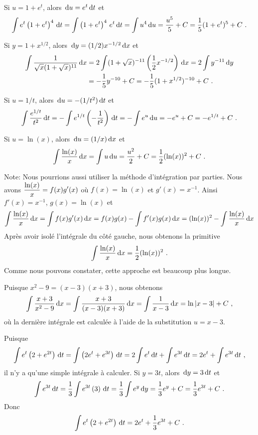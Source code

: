 {
Si $u=1+e^t$, alors $\,\mathrm{d}u = e^t \,\mathrm{d}t$ et
\[
\int e^t\left( 1 + e^t\right)^4 \,\mathrm{d}t =
\int \left( 1 + e^t\right)^4 \, e^t \,\mathrm{d}t = \int u^4 \,\mathrm{d}u
= \frac{u^5}{5} + C = \frac{1}{5}(1+e^t)^5 + C \ .
\]

Si $y=1+x^{1/2}$, alors $\,\mathrm{d}y = (1/2) x^{-1/2} \,\mathrm{d}x$ et
\begin{align*}
\int \frac{1}{\sqrt{x}(1+\sqrt{x})^{11}} \,\mathrm{d}x
&= 2 \int (1+\sqrt{x})^{-11} \left(\frac{1}{2} x^{-1/2}\right) \,\mathrm{d}x
= 2 \int y^{-11} \,\mathrm{d}y \\
&= -\frac{1}{5} y^{-10} + C = -\frac{1}{5} (1+x^{1/2})^{-10} + C \ .
\end{align*}

Si $u=1/t$, alors $\,\mathrm{d}u = -(1/t^2) \,\mathrm{d}t$ et
\[
\int \frac{e^{1/t}}{t^2} \,\mathrm{d}t =
- \int e^{1/t} \left(-\frac{1}{t^2}\right) \,\mathrm{d}t
= -\int e^u \,\mathrm{d}u = -e^u + C = -e^{1/t} + C \ .
\]

Si $u=\ln(x)$, alors $\,\mathrm{d}u = (1/x) \,\mathrm{d}x$ et
\[
\int \frac{\ln(x)}{x} \,\mathrm{d}x = \int u \,\mathrm{d}u
= \frac{u^2}{2} + C = \frac{1}{2} (\ln(x))^2 + C \ .
\]

\noindent Note: Nous pourrions aussi utiliser la méthode d'intégration
par parties.  Nous avons $\displaystyle \frac{\ln(x)}{x} = f(x)g'(x)$ où
$f(x)= \ln(x)$ et $g'(x)=x^{-1}$.  Ainsi $f'(x) = x^{-1}$, $g(x) = \ln(x)$
et
\[
\int \frac{\ln(x)}{x} \,\mathrm{d}x = \int f(x) g'(x) \,\mathrm{d}x
= f(x) g(x) - \int f'(x) g(x) \,\mathrm{d}x
= (\ln(x))^2 - \int \frac{\ln(x)}{x} \,\mathrm{d}x
\]
Après avoir isolé l'intégrale du côté gauche, nous obtenons la
primitive
\[
\int \frac{\ln(x)}{x} \,\mathrm{d}x = \frac{1}{2} (\ln(x))^2 \ .
\]
Comme nous pouvons constater, cette approche est beaucoup plus longue.

Puisque $x^2-9 = (x-3)(x+3)$, nous obtenons
\[
\int \frac{x+3}{x^2-9} \,\mathrm{d}x = \int \frac{x+3}{(x-3)(x+3)} \,\mathrm{d}x
= \int \frac{1}{x-3} \,\mathrm{d}x = \ln|x-3| + C \ ,
\]
où la dernière intégrale est calculée à l'aide de la substitution
$u=x-3$.

Puisque
\[
\int e^{t}\left( 2 + e^{2t}\right) \,\mathrm{d}t
= \int \left( 2e^{t} + e^{3t}\right) \,\mathrm{d}t
= 2 \int e^{t} \,\mathrm{d}t + \int e^{3t} \,\mathrm{d}t
= 2 e^t + \int e^{3t} \,\mathrm{d}t \ ,
\]
il n'y a qu'une simple intégrale à calculer.  Si $y=3t$,
alors $\,\mathrm{d}y = 3\,\mathrm{d}t$ et
\[
\int e^{3t} \,\mathrm{d}t = \frac{1}{3} \int e^{3t} \left( 3 \right)\,\mathrm{d}t
= \frac{1}{3} \int e^y \,\mathrm{d}y = \frac{1}{3} e^y + C
= \frac{1}{3} e^{3t} + C \ .
\]
Donc
\[
\int e^{t}\left( 2 + e^{2t}\right) \,\mathrm{d}t =
2 e^t + \frac{1}{3} e^{3t} + C \ .
\]

}
